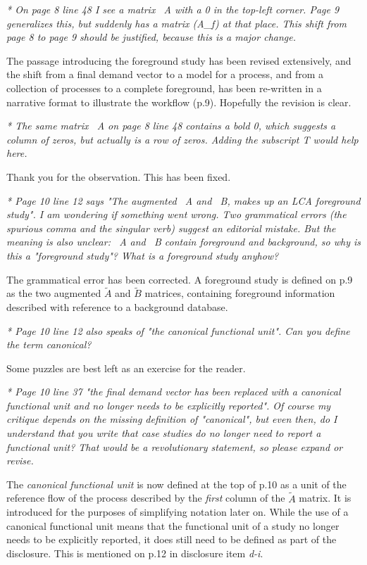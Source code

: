 \documentclass[11pt,letterpaper]{article}
\begin{document}
\emph{* On page 8 line 48 I see a matrix ~A with a 0 in the top-left corner. Page 9 generalizes this, but suddenly has a matrix (A\_f) at that place. This shift from page 8 to page 9 should be justified, because this is a major change.}

The passage introducing the foreground study has been revised extensively, and the shift from a final demand vector to a model for a process, and from a collection of processes to a complete foreground, has been re-written in a narrative format to illustrate the workflow (p.9).  Hopefully the revision is clear.

\emph{* The same matrix ~A on page 8 line 48 contains a bold 0, which suggests a column of zeros, but actually is a row of zeros. Adding the subscript T would help here.}

Thank you for the observation.  This has been fixed.

\emph{* Page 10 line 12 says "The augmented ~A and ~B, makes up an LCA foreground study". I am wondering if something went wrong. Two grammatical errors (the spurious comma and the singular verb) suggest an editorial mistake. But the meaning is also unclear: ~A and ~B contain foreground and background, so why is this a "foreground study"? What is a foreground study anyhow?}

The grammatical error has been corrected.  A foreground study is defined on p.9 as the two augmented $\tilde{A}$ and $\tilde{B}$ matrices, containing foreground information described with reference to a background database.

\emph{* Page 10 line 12 also speaks of "the canonical functional unit". Can you define the term canonical?}

Some puzzles are best left as an exercise for the reader.

\emph{* Page 10 line 37 "the final demand vector has been replaced with a canonical functional unit and no longer needs to be explicitly reported". Of course my critique depends on the missing definition of "canonical", but even then, do I understand that you write that case studies do no longer need to report a functional unit? That would be a revolutionary statement, so please expand or revise. }

The \textit{canonical functional unit} is now defined at the top of p.10 as a unit of the reference flow of the process described by the \textit{first} column of the $\tilde{A}$ matrix. It is introduced for the purposes of simplifying notation later on.  While the use of a canonical functional unit means that the functional unit of a study no longer needs to be explicitly reported, it does still need to be defined as part of the disclosure. This is mentioned on p.12 in disclosure item \emph{d-i}.
\end{document}
